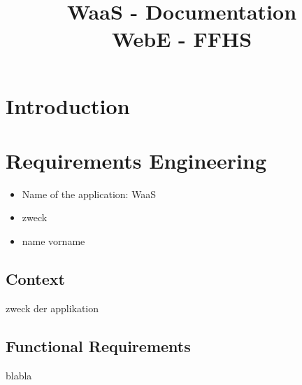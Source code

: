 \documentclass[titlepage, 12pt]{article}
\author{\authorName}
\title{WaaS - Documentation \\ \medskip \large WebE - FFHS}
\begin{document}
\maketitle

\pagebreak

\renewcommand{\contentsname}{Table of Contents}

\tableofcontents

\pagebreak

\section{Introduction}



\pagebreak

\section{Requirements Engineering\label{sectionRequirementsEngineering}}

\begin{itemize}
    \item Name of the application: WaaS
    \item zweck
    \item name vorname
\end{itemize}


\subsection{Context}

zweck der applikation

\subsection{Functional Requirements}

blabla

\pagebreak

\listoftables

\pagebreak

\renewcommand{\refname}{Quellen}


\end{document}
